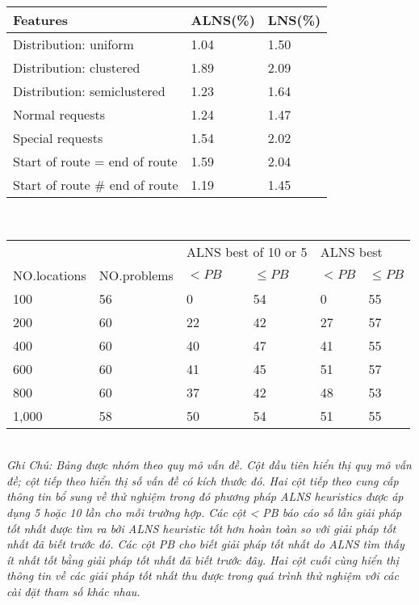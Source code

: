 \begin{table}[caption={Summary of the Influence of Certain Problem Features on the Heuristic Solutions}, label=tab:2]
    \begin{tabular}{lll}
        \toprule
        Features& ALNS(\%) & LNS(\%) \\ \midrule
    Distribution: uniform         & 1.04 & 1.50 \\
    Distribution: clustered       & 1.89 & 2.09       \\
    Distribution: semiclustered   & 1.23 & 1.64       \\
    Normal requests               & 1.24 & 1.47       \\
    Special requests              & 1.54 & 2.02       \\
    Start of route = end of route & 1.59 & 2.04       \\
    Start of route \# end of route & 1.19 & 1.45      
    \end{tabular} \\
\end{table}

\begin{table}[caption={Comparison with Previously Best Known Solutions}, label=tab:2]
    \begin{tabular}{llllll}
        \toprule
         & & \multicolumn{2}{l}{\footnotesize{ALNS best of 10 or 5}} & \multicolumn{2}{l}{\footnotesize{ALNS best}} \\
         \scriptsize{NO.locations} &\scriptsize{NO.problems} &\scriptsize{$< PB$}  &\scriptsize{$\leq PB$} &\scriptsize{$< PB$}  &\scriptsize{$\leq PB$} \\
         \midrule
         100   & 56 & 0  & 54 & 0  & 55 \\
         200   & 60 & 22 & 42 & 27 & 57 \\
         400   & 60 & 40 & 47 & 41 & 55 \\
         600   & 60 & 41 & 45 & 51 & 57 \\
         800   & 60 & 37 & 42 & 48 & 53 \\
         1,000 & 58 & 50 & 54 & 51 & 55  \\
    \end{tabular} \\
    \justify
    \textit{Ghi Chú: Bảng được nhóm theo quy mô vấn đề. Cột đầu tiên hiển thị quy mô vấn đề; cột tiếp theo hiển thị số vấn đề có kích thước đó. Hai cột tiếp theo cung cấp thông tin bổ sung về thử nghiệm trong đó phương pháp ALNS heuristics được áp dụng 5 hoặc 10 lần cho mỗi trường hợp. Các cột < PB báo cáo số lần giải pháp tốt nhất được tìm ra bởi ALNS heuristic tốt hơn hoàn toàn so với giải pháp tốt nhất đã biết trước đó. Các cột PB cho biết giải pháp tốt nhất do ALNS tìm thấy ít nhất tốt bằng giải pháp tốt nhất đã biết trước đây. Hai cột cuối cùng hiển thị thông tin về các giải pháp tốt nhất thu được trong quá trình thử nghiệm với các cài đặt tham số khác nhau.}
\end{table}

